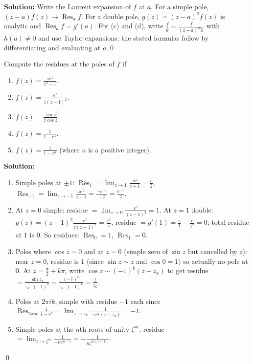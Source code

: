 \bigskip\noindent\textbf{Solution:}
Write the Laurent expansion of $f$ at $a$. For a simple pole, $(z-a)f(z)\to\operatorname{Res}_a f$. For a double pole, $g(z)=(z-a)^2 f(z)$ is analytic and $\operatorname{Res}_a f=g'(a)$. For (c) and (d), write $\frac{f}{g}=\frac{f}{(z-a)^m h}$ with $h(a)\ne0$ and use Taylor expansions; the stated formulas follow by differentiating and evaluating at $a$.\qed


\begin{problembox}
Compute the residues at the poles of \( f \) if
\begin{enumerate}[label=(\alph*)]
\item \( f(z) = \frac{ze^z}{z^2 - 1} \).
\item \( f(z) = \frac{e^z}{z(z - 1)^2} \).
\item \( f(z) = \frac{\sin z}{z \cos z} \).
\item \( f(z) = \frac{1}{1 - e^z} \).
\item \( f(z) = \frac{1}{1 - z^n} \) (where \( n \) is a positive integer).
\end{enumerate}
\end{problembox}

\bigskip\noindent\textbf{Solution:}
\begin{enumerate}[label=(\alph*)]
\item Simple poles at $\pm1$: $\operatorname{Res}_{1}=\lim_{z\to1}\frac{ze^z}{z+1}=\tfrac{e}{2}$, $\operatorname{Res}_{-1}=\lim_{z\to-1}\frac{ze^z}{z-1}=\tfrac{-e^{-1}}{-2}=\tfrac{e^{-1}}{2}$.
\item At $z=0$ simple: residue $=\lim_{z\to0}\frac{e^z}{(z-1)^2}=1$. At $z=1$ double: $g(z)=(z-1)^2\frac{e^z}{z(z-1)^2}=\frac{e^z}{z}$, residue $=g'(1)=\frac{e}{1}-\frac{e}{1^2}=0$; total residue at $1$ is $0$. So residues: $\operatorname{Res}_0=1$, $\operatorname{Res}_1=0$.
\item Poles where $\cos z=0$ and at $z=0$ (simple zero of $\sin z$ but cancelled by $z$): near $z=0$, residue is $1$ (since $\sin z\sim z$ and $\cos 0=1$) so actually no pole at $0$. At $z=\frac{\pi}{2}+k\pi$, write $\cos z\sim (-1)^k(z-z_k)$ to get residue $=\frac{\sin z_k}{z_k\cdot(-1)^k}=\frac{(-1)^k}{z_k\cdot(-1)^k}=\frac{1}{z_k}$.
\item Poles at $2\pi i k$, simple with residue $-1$ each since $\operatorname{Res}_{2\pi i k}\frac{1}{1-e^z}=\lim_{z\to z_k}\frac{1}{-e^{z_k}(z-z_k)}=-1$.
\item Simple poles at the $n$th roots of unity $\zeta^m$: residue $=\lim_{z\to\zeta^m}\frac{1}{-n z^{n-1}}=-\frac{1}{n\zeta^{m(n-1)}}$.
\end{enumerate}\qed


